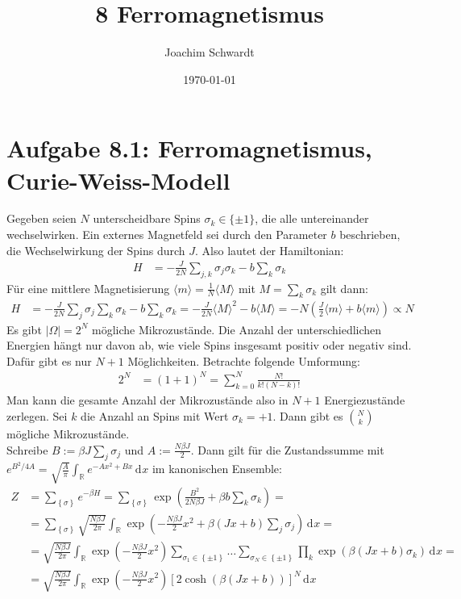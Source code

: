 \documentclass[a4paper,12pt]{article}
\newcommand{\bra}{}
\newcommand{\intr}{}
\newcommand{\kla}{}
\newcommand{\klam}{}
\newcommand{\klammer}{}
\begin{document}
\title{8 Ferromagnetismus}
\author{Joachim Schwardt}
\date{\today}
\maketitle

\section*{Aufgabe 8.1: Ferromagnetismus, Curie-Weiss-Modell}
Gegeben seien $N$ unterscheidbare Spins $\sigma_k\in\{\pm 1\}$, die alle untereinander wechselwirken. Ein externes Magnetfeld sei durch den Parameter $b$ beschrieben, die Wechselwirkung der Spins durch $J$. Also lautet der Hamiltonian:
\begin{align*}
H&=-\frac{J}{2N}\sum_{j,k}\sigma_j\sigma_k - b\sum_k\sigma_k
\end{align*}
Für eine mittlere Magnetisierung $\bra\langle {m}\rangle=\frac{1}{N}\bra\langle {M}\rangle$ mit $M=\sum_k\sigma_k$ gilt dann:
\begin{align*}
H&=-\frac{J}{2N}\sum_j\sigma_j\sum_k\sigma_k-b\sum_k\sigma_k=-\frac{J}{2N}\bra\langle {M}\rangle^2-b\bra\langle {M}\rangle=-N\kla\left( {\frac{J}{2}\bra\langle {m}\rangle+b\bra\langle {m}\rangle} \right)\propto N
\end{align*}
Es gibt $|\Omega|=2^N$ mögliche Mikrozustände. Die Anzahl der unterschiedlichen Energien hängt nur davon ab, wie viele Spins insgesamt positiv oder negativ sind. Dafür gibt es nur $N+1$ Möglichkeiten. Betrachte folgende Umformung:
\begin{align*}
2^N&=\kla\left( {1+1} \right)^N=\sum_{k=0}^N\frac{N!}{k!(N-k)!}
\end{align*}
Man kann die gesamte Anzahl der Mikrozustände also in $N+1$ Energiezustände zerlegen. Sei $k$ die Anzahl an Spins mit Wert $\sigma_k=+1$. Dann gibt es $\binom{N}{k}$ mögliche Mikrozustände.\\
Schreibe $B:=\beta J\sum_j\sigma_j$ und $A:=\frac{N\beta J}{2}$. Dann gilt für die Zustandssumme mit $e^{B^2/4A}=\sqrt{\frac{A}{\pi}}\intr\int_{\mathbb{R}^{ }}{e^{-Ax^2+Bx}}\,\mathrm{d}^{ }x$ im kanonischen Ensemble:
\begin{align*}
Z&=\sum_{\klammer\left\{{\sigma} \right\}} e^{-\beta H}=\sum_{\klammer\left\{{\sigma} \right\}}\exp\kla\left( {\frac{B^2}{2N\beta J}+\beta b\sum_k\sigma_k} \right)=\\
&=\sum_{\klammer\left\{{\sigma} \right\}}\sqrt{\frac{N\beta J}{2\pi}}\intr\int_{\mathbb{R}^{ }}{\exp\kla\left( {-\frac{N\beta J}{2}x^2+\beta(Jx+b)\sum_j\sigma_j} \right)}\,\mathrm{d}^{ }x=\\
&=\sqrt{\frac{N\beta J}{2\pi}}\intr\int_{\mathbb{R}^{ }}{\exp\kla\left( {-\frac{N\beta J}{2}x^2} \right)\sum_{\sigma_1\in\klammer\left\{{\pm 1} \right\}}\dots\sum_{\sigma_N\in\klammer\left\{{\pm 1} \right\}}\prod_k\exp\kla\left( {\beta(Jx+b)\sigma_k} \right)}\,\mathrm{d}^{ }x=\\
&=\sqrt{\frac{N\beta J}{2\pi}}\intr\int_{\mathbb{R}^{ }}{\exp\kla\left( {-\frac{N\beta J}{2}x^2} \right)\klam\left[ {2\cosh\kla\left( {\beta (Jx+b)} \right)} \right]^N}\,\mathrm{d}^{ }x
\end{align*}
\end{document}
